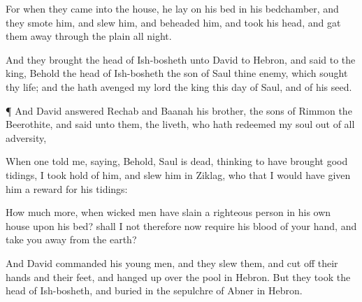 {For when they
came into the
house, he
lay on his
bed in his
bedchamber, and they
smote him, and
slew him, and
beheaded him, and
took his
head, and gat them
away
through the
plain all
night.

And they
brought the
head of
Ish-bosheth unto
David to
Hebron, and
said to the
king, Behold the
head of
Ish-bosheth the
son of
Saul thine
enemy, which
sought thy
life; and the
{}
hath
avenged my
lord the
king this
day of
Saul, and of his
seed.


\par }{\PP {}¶ And
David
answered
Rechab and
Baanah his
brother, the
sons of
Rimmon the
Beerothite, and
said unto them,
{} the
{}
liveth, who hath
redeemed my
soul out of all
adversity,

When one
told me,
saying, Behold,
Saul is
dead, thinking to have
brought good
tidings, I took
hold of him, and
slew him in
Ziklag, who
{} that I would have
given him a reward for his
tidings:

How much more, when
wicked
men have
slain a
righteous
person in his own
house upon his
bed? shall I not therefore now
require his
blood of your
hand, and take you
away from the
earth?

And
David
commanded his young
men, and they
slew them, and cut
off their
hands and their
feet, and hanged
{}
up over the
pool in
Hebron. But they
took the
head of
Ish-bosheth, and
buried
{} in the
sepulchre of
Abner in
Hebron.




\par }
